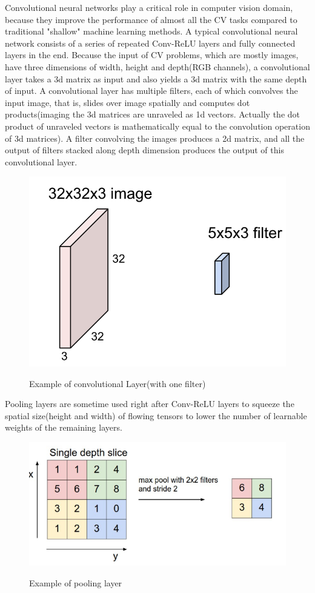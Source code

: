 \documentclass{article} %
\begin{document}
Convolutional neural networks play a critical role in computer vision domain, because they improve the performance of almost all the CV tasks compared to traditional "shallow" machine learning methods. A typical convolutional neural network consists of a series of repeated Conv-ReLU layers and fully connected layers in the end. Because the input of CV problems, which are mostly images, have three dimensions of width, height and depth(RGB channels), a convolutional layer takes a 3d matrix as input and also yields a 3d matrix with the same depth of input. A convolutional layer has multiple filters, each of which convolves the input image, that is, slides over image spatially and computes dot products(imaging the 3d matrices are unraveled as 1d vectors. Actually the dot product of unraveled vectors is mathematically equal to the convolution operation of 3d matrices). A filter convolving the images produces a 2d matrix, and all the output of filters stacked along depth dimension produces the output of this convolutional layer.

\begin{figure}[H]
	\centering
	\includegraphics[width=.4\textwidth]{convlayer.png}
	\label{fig:convlayer}
	\caption{Example of convolutional Layer(with one filter)}
\end{figure}

Pooling layers are sometime used right after Conv-ReLU layers to squeeze the spatial size(height and width) of flowing tensors to lower the number of learnable weights of the remaining layers. 
\begin{figure}[H]
	\centering
	\includegraphics[width=.5\textwidth]{poolinglayer.png}
	\label{fig:poolinglayer}
	\caption{Example of pooling layer}
\end{figure}
\end{document}

